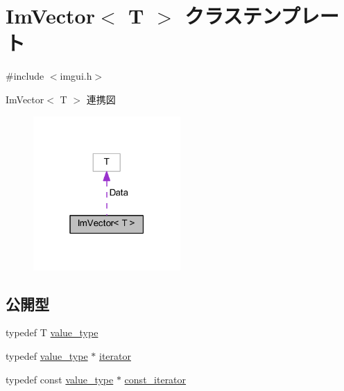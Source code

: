 \hypertarget{class_im_vector}{}\section{Im\+Vector$<$ T $>$ クラステンプレート}
\label{class_im_vector}


{\ttfamily \#include $<$imgui.\+h$>$}



Im\+Vector$<$ T $>$ 連携図\nopagebreak
\begin{figure}[H]
\begin{center}
\leavevmode
\includegraphics[width=159pt]{class_im_vector__coll__graph}
\end{center}
\end{figure}
\subsection*{公開型}
\begin{DoxyCompactItemize}
\item 
typedef T \mbox{\hyperlink{class_im_vector_a8bd77e4e7581d8e5f9e98d7c2f3c2a80}{value\+\_\+type}}
\item 
typedef \mbox{\hyperlink{class_im_vector_a8bd77e4e7581d8e5f9e98d7c2f3c2a80}{value\+\_\+type}} $\ast$ \mbox{\hyperlink{class_im_vector_a74b5478f1f6fd471cc71219bce483db6}{iterator}}
\item 
typedef const \mbox{\hyperlink{class_im_vector_a8bd77e4e7581d8e5f9e98d7c2f3c2a80}{value\+\_\+type}} $\ast$ \mbox{\hyperlink{class_im_vector_aedeac9c5080f9d6ce96ae837768ee4c4}{const\+\_\+iterator}}
\end{DoxyCompactItemize}
